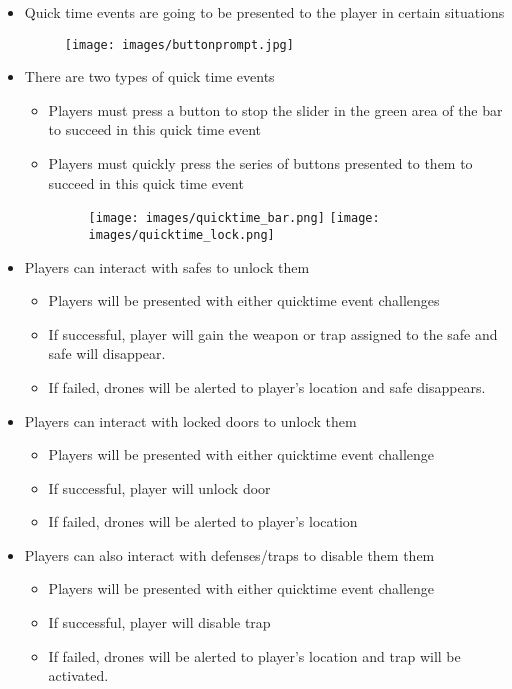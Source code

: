 \documentclass[10pt]{report}
\begin{document}
\begin{itemize}
    \item Quick time events are going to be presented to the player in certain situations
    \begin{figure}[H]
        \centering
        \texttt{[image: images/buttonprompt.jpg]}
    \end{figure}
    \item There are two types of quick time events
    \begin{itemize}
        \item Players must press a button to stop the slider in the green area of the bar to  succeed in this quick time event 
        \item Players must quickly press the series of buttons presented to them to succeed in this quick time event
        \begin{figure}[H]
            \centering
            \texttt{[image: images/quicktime\_bar.png]}
            \texttt{[image: images/quicktime\_lock.png]}
        \end{figure}
    \end{itemize}
    \item Players can interact with safes to unlock them
    \begin{itemize}
        \item Players will be presented with either quicktime event challenges
        \item If successful, player will gain the weapon or trap assigned to the safe and safe will disappear.
        \item If failed, drones will be alerted to player’s location and safe disappears.
    \end{itemize}
    \item Players can interact with locked doors to unlock them
    \begin{itemize}
        \item Players will be presented with either quicktime event challenge
        \item If successful, player will unlock door 
        \item If failed, drones will be alerted to player’s location
    \end{itemize}
    \item Players can also interact with defenses/traps to disable them them
    \begin{itemize}
        \item Players will be presented with either quicktime event challenge
        \item If successful, player will disable trap 
        \item If failed, drones will be alerted to player’s location and trap will be activated.
    \end{itemize}
\end{itemize}
\end{document}

